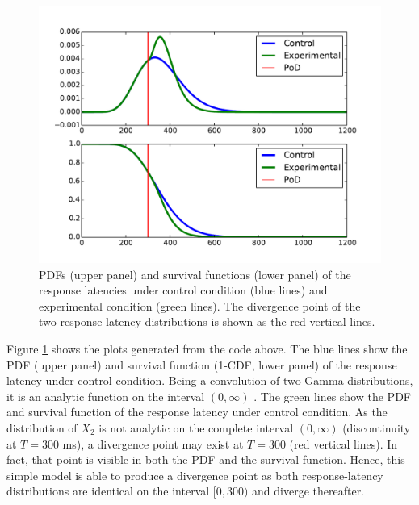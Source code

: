 \begin{figure} [!ht]
 \centering
 \includegraphics[width=.6\textwidth]{pod.pdf}
 \caption{PDFs (upper panel) and survival functions (lower panel) of the response latencies under 
 control condition (blue lines) and experimental condition (green lines).  The divergence point of 
 the two response-latency distributions is shown as the red vertical lines. \label{fig:pod}}
\end{figure}

Figure \ref{fig:pod} shows the plots generated from the code above. The blue lines show the PDF
(upper panel) and survival function (1-CDF, lower panel) of the response latency under control
condition. Being a convolution of two Gamma distributions, it is an analytic function on the
interval $(0,\infty)$ \citep{Gelooven1999}. The green lines show the PDF and survival function
of the response latency under control condition. As the distribution of $X_2$ is not analytic on the complete interval
$(0,\infty)$ (discontinuity at $T=300$ ms), a divergence point may exist at $T=300$ (red vertical
lines).  In fact, that point is visible in both the PDF and the survival function. Hence, this simple
model is able to produce a divergence point as both response-latency distributions are identical
on the interval $[0,300)$ and diverge thereafter.
